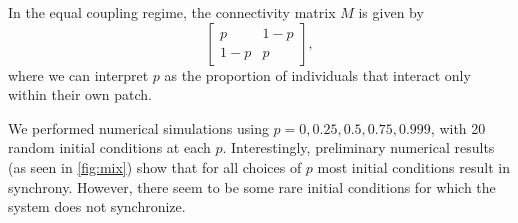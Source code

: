 \documentclass[12pt]{article}
\begin{document}
In the equal coupling regime, the connectivity matrix $M$ is given by
\begin{equation}
\begin{bmatrix}
p &		{1-p} \\
{1-p} &		p
\end{bmatrix},
\end{equation}
where we can interpret $p$ as the proportion of individuals that interact only within their own patch. 

We performed numerical simulations using $p = 0, 0.25, 0.5, 0.75, 0.999$, with 20 random initial conditions at each $p$. Interestingly, preliminary numerical results (as seen in \autoref{fig:mix}) show that for all choices of $p$ most initial conditions result in synchrony. However, there seem to be some rare initial conditions for which the system does not synchronize.
\end{document}
